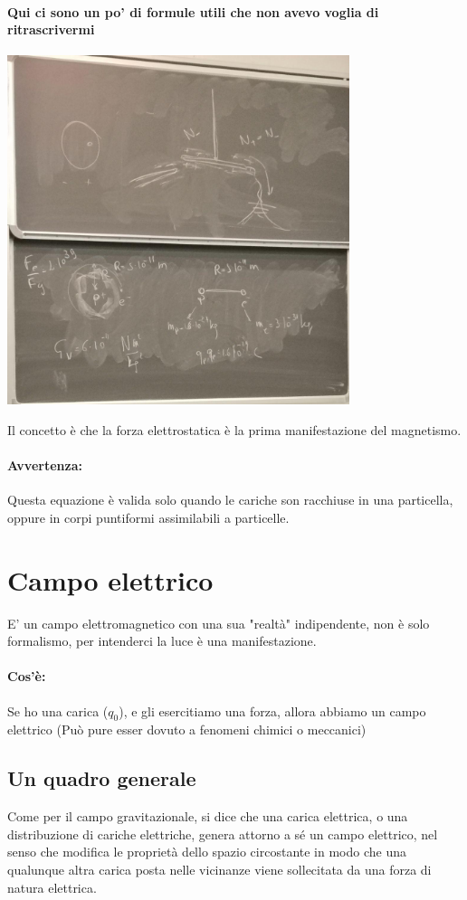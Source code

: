 \documentclass[12pt, a4paper, openany, oneside]{book}
\begin{document}
\paragraph{Qui ci sono un po' di formule utili che non avevo voglia di
ritrascrivermi}
\begin{center}
\includegraphics[width=0.75\textwidth]{19}
\end{center}
Il concetto è che la forza elettrostatica è la prima manifestazione del magnetismo.
\paragraph{Avvertenza: }Questa equazione è valida solo quando le cariche son
racchiuse in una particella, oppure in corpi puntiformi assimilabili a particelle.
\section{Campo elettrico}
E' un campo elettromagnetico con una sua "realtà" indipendente, non è solo
formalismo, per intenderci la luce è una manifestazione.
\paragraph{Cos'è: }Se ho una carica ($q_{0}$), e gli esercitiamo una forza, allora
abbiamo un campo elettrico (Può pure esser dovuto a fenomeni chimici o 
meccanici)
\subsection{Un quadro generale}
Come per il campo gravitazionale, si dice che una carica elettrica, o una 
distribuzione di cariche elettriche, genera attorno a sé un campo elettrico, nel
senso che modifica le proprietà dello spazio circostante in modo che una 
qualunque altra carica posta nelle vicinanze viene sollecitata da una forza di 
natura elettrica. 
\end{document}
